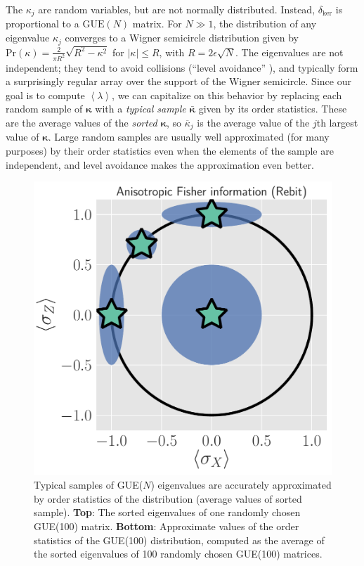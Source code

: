 \documentclass[aps,pra, twocolumn]{revtex4}
\newcommand{\expect}[1]{\ensuremath{\left\langle#1\right\rangle}}
\newcommand{\bvec}[1]{\boldsymbol{#1}}
\begin{document}
The $\kappa_j$ are random variables, but are not normally distributed.  Instead, $\delta_{\mathrm{ker}}$ is proportional to a $\mathrm{GUE}(N)$ matrix. For $N\gg1$, the distribution of any eigenvalue $\kappa_{j}$
converges to a Wigner semicircle distribution \cite{Wigner1958} given by $\mathrm{Pr}(\kappa) = \frac{2}{\pi R^{2}}\sqrt{R^{2}-\kappa^{2}}$ for $|\kappa| \leq R$, with $R = 2\epsilon\sqrt{N}$.  The eigenvalues are not independent; they tend to avoid collisions (``level avoidance'' \cite{Tao2013}), 
and typically form a surprisingly regular array over the support of the Wigner semicircle.  Since our goal is to compute $\expect{\lambda}$, we can capitalize on this behavior by replacing each random sample of $\bvec{\kappa}$ with a 
\emph{typical sample} $\bar{\bvec{\kappa}}$ given by its order statistics.  These are the average values of the \emph{sorted} 
$\bvec{\kappa}$, so $\overline{\kappa}_j$ is the average value of the $j$th largest value of $\bvec{\kappa}$.  Large random samples 
are usually well approximated (for many purposes) by their order statistics even when the elements of the sample are 
independent, and level avoidance makes the approximation even better. 

\begin{figure}[h!]
\includegraphics[width=\columnwidth]{Images/Figure_5.pdf}
\caption{Typical samples of GUE($N$) eigenvalues are accurately approximated by order statistics of the distribution (average values of sorted sample).  \textbf{Top}:  The sorted eigenvalues of one randomly chosen GUE(100) matrix.  \textbf{Bottom}:  Approximate values of the order statistics of the GUE(100) distribution, computed as the average of the sorted eigenvalues of 100 randomly chosen GUE(100) matrices.}
\label{fig:orderstatistics1}
\end{figure}
\end{document}
